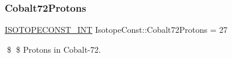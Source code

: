 \subsubsection{\texorpdfstring{Cobalt72\+Protons}{Cobalt72Protons}}
{\footnotesize\ttfamily \mbox{\hyperlink{group___isotope_const-_macros_ga5f18360b3e99483a35c32d789e62621c}{I\+S\+O\+T\+O\+P\+E\+C\+O\+N\+S\+T\+\_\+\+I\+NT}} Isotope\+Const\+::\+Cobalt72\+Protons = 27}

\$ \$ Protons in Cobalt-\/72. 